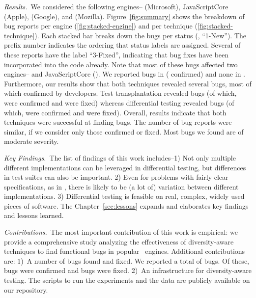 \sloppy \emph{Results.}~We considered the following engines--\chakra{}
(Microsoft), JavaScriptCore (Apple), \veight{} (Google), and
\smonkey{} (Mozilla). Figure~\ref{fig:summary} shows the breakdown of
bug reports per engine (\ref{fig:stacked-engine}) and per technique
(\ref{fig:stacked-technique}). Each stacked bar breaks down the bugs
per status (\eg{}, ``1-New''). The prefix number indicates the
ordering that status labels are assigned. Several of these
reports have the label ``3-Fixed'', indicating that bug fixes have
been incorporated into the code already. Note that most of these bugs
affected two engines--\chakra{} and JavaScriptCore (\jsc{}).  We
reported \noBugsBugsReportedGoogle{} bugs in \veight{}
(\noBugsBugsConfirmedGoogle{} confirmed) and none in \smonkey{}.
Furthermore, our results show that both techniques revealed several
bugs, most of which confirmed by developers. Test transplantation
revealed \noBugsTransplantation{} bugs (of which,
\noBugsTransplantationConfirmed{} were confirmed and
\noBugsTransplantationFixed{} were fixed) whereas differential testing
revealed \noBugsDifferentialTesting{} bugs (of which,
\noBugsDifferentialTestingConfirmed{} were confirmed and
\noBugsDifferentialTestingFixed{} were fixed).  Overall, results
indicate that both techniques were successful at finding bugs. The
number of bug reports were similar, if we consider only those
confirmed or fixed. Most bugs we found are of moderate severity.



\emph{Key Findings.}~The list of findings of this work includes--1)
Not only multiple different implementations can be leveraged in
differential testing, but differences in test suites can also be
important. 2) Even for problems with fairly clear specifications, as
in \javascript{}, there is likely to be (a lot of) variation between
different implementations. 3) Differential testing is feasible on
real, complex, widely used pieces of
software. The Chapter~\ref{sec:lessons} expands and elaborates key
findings and lessons learned.

\emph{Contributions.}~The most important contribution of this work is empirical: 
we provide a comprehensive study analyzing the effectiveness of diversity-aware
techniques to find functional bugs in popular \javascript\ engines.
Additional contributions are:
1)~A number of bugs found and fixed. 
We reported a total of \totalBugsReported{} bugs. 
Of these, \totalBugsConfirmed{} bugs were confirmed and \totalBugsFixed{} bugs were fixed. 
2)~An infrastructure for diversity-aware testing.
The scripts to run the experiments and the data are publicly available on our repository.

